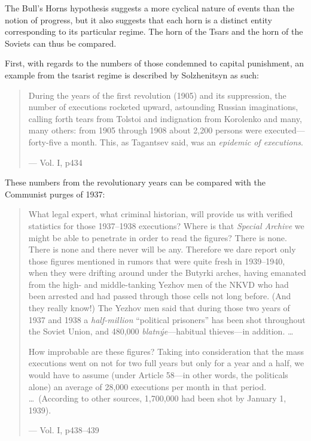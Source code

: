 \documentclass{article}
\begin{document}
The Bull's Horns hypothesis suggests a more cyclical nature of events than the notion of progress, but it also suggests that each horn is a distinct entity corresponding to its particular regime.  The horn of the Tsars and the horn of the Soviets can thus be compared.

First, with regards to the numbers of those condemned to capital punishment, an example from the tsarist regime is described by Solzhenitsyn as such:

\begin{quote}
During the years of the first revolution (1905) and its suppression, the number of executions rocketed upward, astounding Russian imaginations, calling forth tears from Tolstoi and indignation from Korolenko and many, many others: from 1905 through 1908 about 2,200 persons were executed---forty-five a month.  This, as Tagantsev said, was an \emph{epidemic of executions}.

--- Vol. I, p434
\end{quote}

These numbers from the revolutionary years can be compared with the Communist purges of 1937:

\begin{quote}
What legal expert, what criminal historian, will provide us with verified statistics for those 1937--1938 executions?  Where is that \emph{Special Archive} we might be able to penetrate in order to read the figures?  There is none.  There is none and there never will be any.  Therefore we dare report only those figures mentioned in rumors that were quite fresh in 1939--1940, when they were drifting around under the Butyrki arches, having emanated from the high- and middle-tanking Yezhov men of the NKVD who had been arrested and had passed through those cells not long before.  (And they really know!) The Yezhov men said that during those two years of 1937 and 1938 a \emph{half-million} ``political prisoners'' has been shot throughout the Soviet Union, and 480,000 \emph{blatn\'{y}e}---habitual thieves---in addition.  \ldots

How improbable are these figures?  Taking into consideration that the mass executions went on not for two full years but only for a year and a half, we would have to assume (under Article 58---in other words, the politicals alone) an average of 28,000 executions per month in that period.  \ldots~(According to other sources, 1,700,000 had been shot by January 1, 1939).

--- Vol. I, p438--439
\end{quote}
\end{document}
